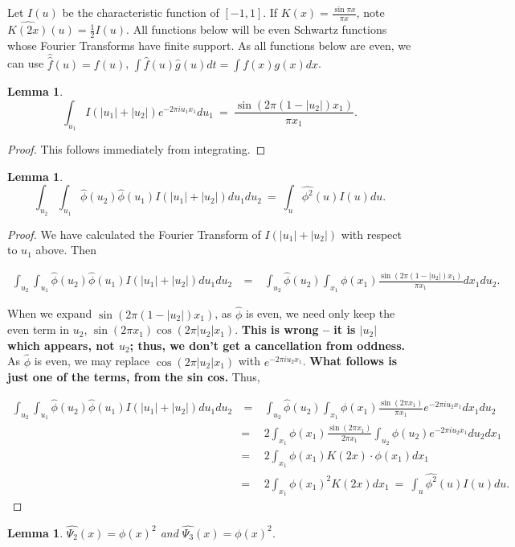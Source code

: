 \documentclass{compositio}
\newcommand\be{\begin{equation}}
\newcommand\ee{\end{equation}}
\newcommand\bp{\begin{proof}}
\newcommand\ep{\end{proof}}
\newcommand\bea{\begin{eqnarray}}
\newcommand\eea{\end{eqnarray}}
\newtheorem{lem}[thm]{Lemma}
\newcommand{\hphi}{\widehat{\phi}}  %
\newcommand{\foh}{\frac{1}{2}}  %
\begin{document}
Let $I(u)$ be the characteristic function of $[-1,1]$. If $K(x) =
\frac{\sin \pi x}{\pi x}$, note $\widehat{K(2x)}(u) = \foh I(u)$.
All functions below will be even Schwartz functions whose Fourier
Transforms have finite support. As all functions below are even,
we can use $\widehat{\widehat{f}}(u) = f(u)$, $\int \widehat{f}(u)
\widehat{g}(u)dt = \int f(x)g(x)dx$.

\begin{lem} \be \int_{u_1} I(|u_1|+|u_2|) e^{-2\pi i u_1 x_1}du_1
\ = \ \frac{\sin(2\pi(1-|u_2|)x_1)}{\pi x_1}. \ee \end{lem}

\bp This follows immediately from integrating. \ep

\begin{lem} \be \int_{u_2} \int_{u_1} \hphi(u_2)\hphi(u_1)
I(|u_1|+|u_2|)du_1du_2 \ = \ \int_u \widehat{\phi^2}(u)I(u)du. \ee
\end{lem}

\bp We have calculated the Fourier Transform of $I(|u_1|+|u_2|)$
with respect to $u_1$ above. Then

\bea \int_{u_2} \int_{u_1} \hphi(u_2)\hphi(u_1)
I(|u_1|+|u_2|)du_1du_2 & \ = \ & \int_{u_2}\hphi(u_2) \int_{x_1}
\phi(x_1) \frac{\sin(2\pi(1-|u_2|)x_1)}{\pi x_1} dx_1du_2. \ \ \
\eea

When we expand $\sin(2\pi(1-|u_2|)x_1)$, as $\hphi$ is even, we
need only keep the even term in $u_2$, $\sin(2\pi x_1) \cos(2\pi
|u_2|x_1)$. \textbf{This is wrong -- it is $|u_2|$ which appears,
not $u_2$; thus, we don't get a cancellation from oddness.} As
$\hphi$ is even, we may replace $\cos(2\pi|u_2|x_1)$ with
$e^{-2\pi i u_2 x_1}$. \textbf{What follows is just one of the
terms, from the sin cos.} Thus,

\bea \int_{u_2} \int_{u_1} \hphi(u_2)\hphi(u_1)
I(|u_1|+|u_2|)du_1du_2 & \ = \ & \int_{u_2} \hphi(u_2)\int_{x_1}
\phi(x_1) \frac{\sin(2\pi x_1)}{\pi x_1} e^{-2\pi i u_2x_1}
dx_1du_2 \nonumber\\ & = & 2\int_{x_1} \phi(x_1) \frac{\sin(2\pi
x_1)}{2\pi x_1} \int_{u_2} \hphi(u_2) e^{-2\pi i u_2 x_1} du_2
dx_1 \nonumber\\ & = & 2\int_{x_1} \phi(x_1) K(2x) \cdot \phi(x_1)
dx_1 \nonumber\\ & = & 2 \int_{x_1} \phi(x_1)^2 K(2x) dx_1 \ = \
\int_u \widehat{\phi^2}(u) I(u)du. \eea

\ep

\begin{lem}\label{lempsitwohat} $\widehat{\Psi_2}(x) = \phi(x)^2$ and
$\widehat{\Psi_3}(x) = \phi(x)^2$. \end{lem}
\end{document}
